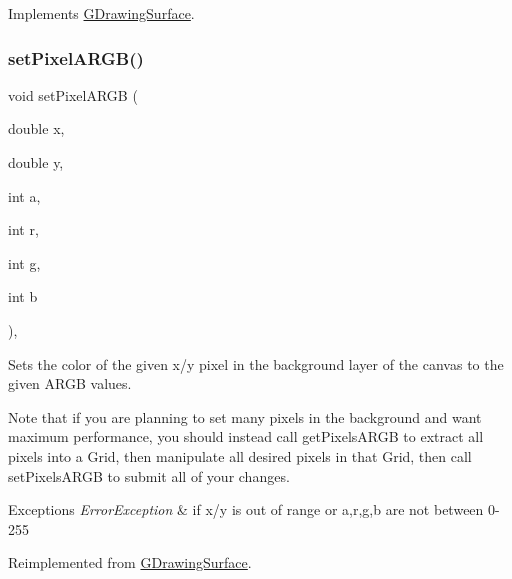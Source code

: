 Implements \mbox{\hyperlink{classGDrawingSurface_ab2f7c5a9462f552ad3f30d23c04605dd}{G\+Drawing\+Surface}}.

\mbox{\label{classGCanvas_a2d22778c4fdce45bb2df60518000c5ad}} 
\subsubsection{\texorpdfstring{set\+Pixel\+A\+R\+G\+B()}{setPixelARGB()}\hspace{0.1cm}{\footnotesize\ttfamily [2/2]}}
{\footnotesize\ttfamily void set\+Pixel\+A\+R\+GB (\begin{DoxyParamCaption}\item[{double}]{x,  }\item[{double}]{y,  }\item[{int}]{a,  }\item[{int}]{r,  }\item[{int}]{g,  }\item[{int}]{b }\end{DoxyParamCaption})\hspace{0.3cm}{\ttfamily [override]}, {\ttfamily [virtual]}}



Sets the color of the given x/y pixel in the background layer of the canvas to the given A\+R\+GB values. 

Note that if you are planning to set many pixels in the background and want maximum performance, you should instead call get\+Pixels\+A\+R\+GB to extract all pixels into a Grid, then manipulate all desired pixels in that Grid, then call set\+Pixels\+A\+R\+GB to submit all of your changes.


\begin{DoxyExceptions}{Exceptions}
{\em Error\+Exception} & if x/y is out of range or a,r,g,b are not between 0-\/255 \\
\hline
\end{DoxyExceptions}


Reimplemented from \mbox{\hyperlink{classGDrawingSurface_a62a8b1555ae3a073a84b0a1c071c65b1}{G\+Drawing\+Surface}}.

\mbox{\label{classGCanvas_ad151c93e985bb28b4f1207496c3ed024}} 
